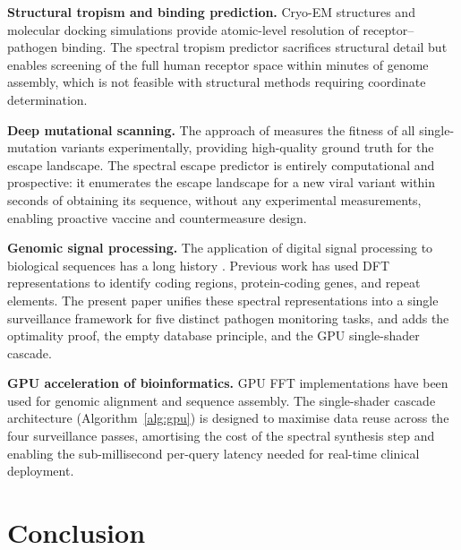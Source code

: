 \documentclass[twocolumn,11pt,a4paper]{article}
\theoremstyle{definition}
\theoremstyle{remark}
\begin{document}
\noindent\textbf{Structural tropism and binding prediction.} Cryo-EM
structures \citep{lan2020} and molecular docking simulations provide
atomic-level resolution of receptor--pathogen binding. The spectral tropism
predictor sacrifices structural detail but enables screening of the full human
receptor space within minutes of genome assembly, which is not feasible with
structural methods requiring coordinate determination.

\noindent\textbf{Deep mutational scanning.} The approach of \citet{bloom2014}
measures the fitness of all single-mutation variants experimentally, providing
high-quality ground truth for the escape landscape. The spectral escape predictor
is entirely computational and prospective: it enumerates the escape landscape
for a new viral variant within seconds of obtaining its sequence, without any
experimental measurements, enabling proactive vaccine and countermeasure design.

\noindent\textbf{Genomic signal processing.} The application of digital signal
processing to biological sequences has a long history \citep{anastassiou2001,
voss1992}. Previous work has used DFT representations to identify coding
regions, protein-coding genes, and repeat elements. The present paper unifies
these spectral representations into a single surveillance framework for five
distinct pathogen monitoring tasks, and adds the optimality proof, the empty
database principle, and the GPU single-shader cascade.

\noindent\textbf{GPU acceleration of bioinformatics.} GPU FFT implementations
\citep{moreland2003, govindaraju2008} have been used for genomic alignment and
sequence assembly. The single-shader cascade architecture (Algorithm~\ref{alg:gpu})
is designed to maximise data reuse across the four surveillance passes, amortising
the cost of the spectral synthesis step and enabling the sub-millisecond
per-query latency needed for real-time clinical deployment.

\section{Conclusion}
\label{sec:conclusion}
\end{document}
